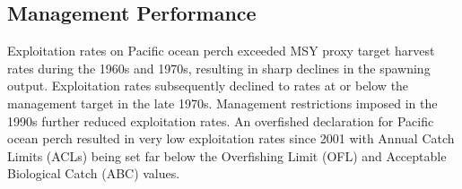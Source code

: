 \documentclass[12pt,]{article}
\begin{document}
\FloatBarrier

\subsection*{Management Performance}\label{management-performance}

Exploitation rates on Pacific ocean perch exceeded MSY proxy target
harvest rates during the 1960s and 1970s, resulting in sharp declines in
the spawning output. Exploitation rates subsequently declined to rates
at or below the management target in the late 1970s. Management
restrictions imposed in the 1990s further reduced exploitation rates. An
overfished declaration for Pacific ocean perch resulted in very low
exploitation rates since 2001 with Annual Catch Limits (ACLs) being set
far below the Overfishing Limit (OFL) and Acceptable Biological Catch
(ABC) values.

\begin{table}[ht]
\centering
\caption{Recent trend in total catch and  
                              landings (mt) relative to the management guidelines. 
                              Estimated total catch reflect the landings 
                              plus the model estimated discarded biomass based on discard rate data.} 
\label{tab:mnmgt_perform}
\end{table}
\end{document}

